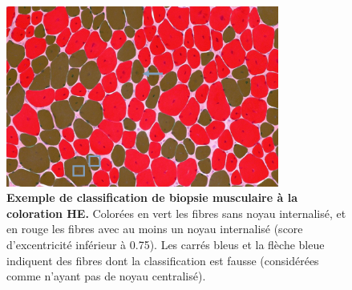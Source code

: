 \begin{figure}[!htbp]
 \centering
 \includegraphics[width=0.8\textwidth]{figures/he_paint.png}
 \caption[Exemple de classification de biopsie musculaire à la coloration HE]{\textbf{Exemple de classification de biopsie musculaire à la coloration HE. }Colorées en vert les fibres sans noyau internalisé, et en rouge les fibres avec au moins un noyau internalisé (score d'excentricité inférieur à 0.75). Les carrés bleus et la flèche bleue indiquent des fibres dont la classification est fausse (considérées comme n'ayant pas de noyau centralisé).}
 \label{fig:he_paint}
\end{figure}

